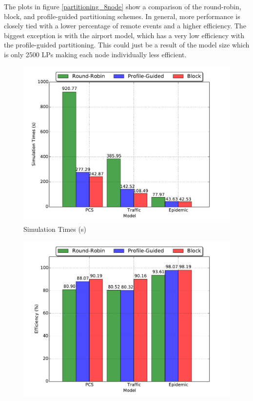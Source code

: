 \documentclass[11pt]{book}
\begin{document}
The plots in figure \ref{partitioning_8node} show a comparison of the round-robin, block, and
profile-guided partitioning schemes. In general, more performance is closely tied with a lower
percentage of remote events and a higher efficiency. The biggest exception is with the airport
model, which has a very low efficiency with the profile-guided partitioning. This could just
be a result of the model size which is only 2500 LPs making each node individually less efficient.

\begin{figure}
  \begin{minipage}{.5\textwidth}
    \begin{center}
      \includegraphics[width=\textwidth,keepaspectratio,quiet]{figs/partitioning_communication/partitioning_time_8node.pdf} \\
      Simulation Times (s) \\
    \end{center}
  \end{minipage}%
  \hfill
  \begin{minipage}{.5\textwidth}
    \begin{center}
      \includegraphics[width=\textwidth,keepaspectratio,quiet]{figs/partitioning_communication/partitioning_efficiency_8node.pdf} \\

\end{center}
\end{minipage}
\end{figure}
\end{document}
